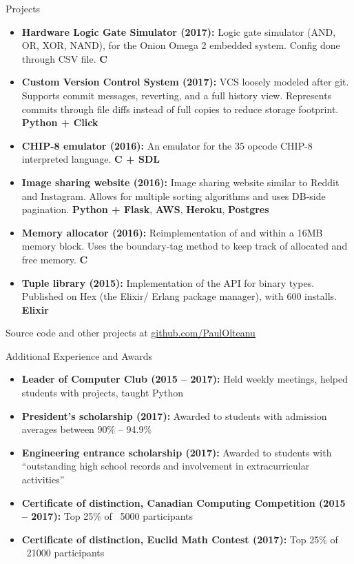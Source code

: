 \documentclass[calibri]{mcdowellcv}
\begin{document}
    \begin{cvsection}{\Large{Projects}}
        \begin{cvsubsection}{}{}{}
            \begin{itemize}
                \item \textbf{Hardware Logic Gate Simulator (2017):} Logic gate simulator (AND, OR, XOR, NAND), for the Onion Omega 2 embedded system. Config done through CSV file. \textbf{C}
                \item \textbf{Custom Version Control System (2017):} VCS loosely modeled after git. Supports commit messages, reverting, and a full history view. Represents commits through file diffs instead of full copies to reduce storage footprint. \textbf{Python + Click}
                \item \textbf{CHIP-8 emulator (2016):} An emulator for the 35 opcode CHIP-8 interpreted language. \textbf{C + SDL}
                \item \textbf{Image sharing website (2016):} Image sharing website similar to Reddit and Instagram. Allows for multiple sorting algorithms and uses DB-side pagination. \textbf{Python + Flask}, \textbf{AWS}, \textbf{Heroku}, \textbf{Postgres}
                \item \textbf{Memory allocator (2016):} Reimplementation of  and  within a 16MB memory block. Uses the boundary-tag method to keep track of allocated and free memory. \textbf{C}
                \item \textbf{Tuple library (2015):} Implementation of the  API for binary types. Published on Hex (the Elixir/ Erlang package manager), with 600 installs. \textbf{Elixir}
            \end{itemize}
            Source code and other projects at \underline{github.com/PaulOlteanu}
        \end{cvsubsection}
    \end{cvsection}

    \begin{cvsection}{\Large{Additional Experience and Awards}}
        \begin{cvsubsection}{}{}{}
            \begin{itemize}
                \item \textbf{Leader of Computer Club (2015 -- 2017):} Held weekly meetings, helped students with projects, taught Python
                \item \textbf{President's scholarship (2017):} Awarded to students with admission averages between 90\% -- 94.9\%
                \item \textbf{Engineering entrance scholarship (2017):} Awarded to students with ``outstanding high school records and involvement in extracurricular activities''
                \item \textbf{Certificate of distinction, Canadian Computing Competition (2015 -- 2017):} Top 25\% of ~5000 participants
                \item \textbf{Certificate of distinction, Euclid Math Contest (2017):} Top 25\% of ~21000 participants
            \end{itemize}
        \end{cvsubsection}
    \end{cvsection}
\end{document}

